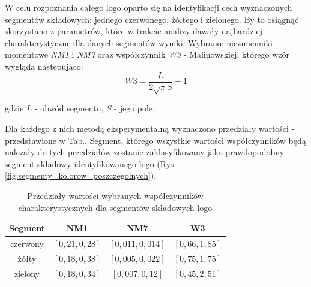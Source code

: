 W celu rozpoznania całego logo oparto się na identyfikacji cech wyznaczonych segmentów składowych: jednego czerwonego, żółtego i zielonego. By to osiągnąć skorzystano z parametrów, które w trakcie analizy dawały najbardziej charakterystyczne dla danych segmentów wyniki. Wybrano: niezmienniki momentowe \emph{NM1} i \emph{NM7} oraz współczynnik \emph{W3}  - Malinowskiej, którego wzór wygląda następująco:
\begin{equation}
    W3=\frac{L}{2\sqrt{\pi}S}-1
\end{equation}
\begin{center}
    gdzie $L$ - obwód segmentu, $S$ - jego pole.
\end{center}

Dla każdego z nich metodą eksperymentalną wyznaczono przedziały wartości - przedstawione w Tab.. Segment, którego wszystkie wartości współczynników będą należały do tych przedziałów zostanie zaklasyfikowany jako prawdopodobny segment składowy identyfikowanego logo (Rys. \ref{fig:segmenty_kolorow_poszczegolnych}).

\begin{table}[H]
    \centering
    \begin{tabular}{|c|c|c|c|}
    \hline
         Segment & NM1 & NM7 & W3 \\
         \hline
         czerwony & $[0,21, 0,28]$ & $[0,011, 0,014]$ &  $[0,66, 1,85]$\\
         \hline
         żółty & $[0,18, 0,38]$ & $[0,005, 0,022]$ &  $[0,75, 1,75]$\\
         \hline
         zielony & $[0,18, 0,34]$ & $[0,007, 0,12]$ &  $[0,45, 2,51]$\\
         \hline
    \end{tabular}
    \caption{Przedziały wartości wybranych współczynników charakterystycznych dla segmentów składowych logo}
    \label{tab:przedzialy_wspolczynnikow}
\end{table}


